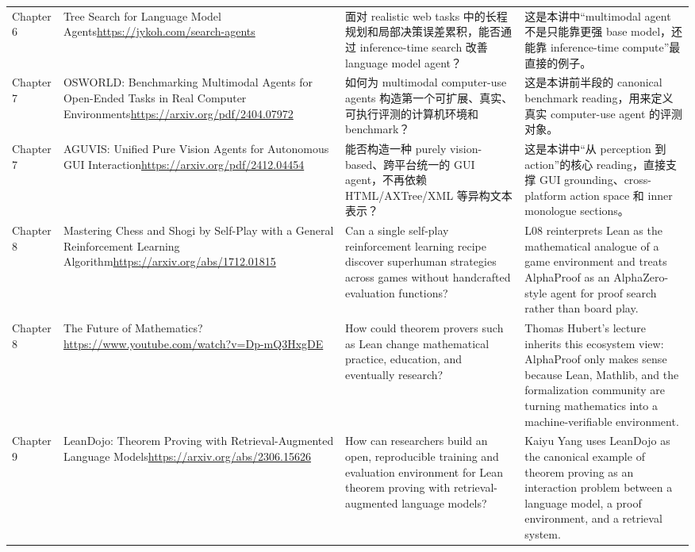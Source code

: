 \begin{longtable}{p{}p{}p{}p{}}
Chapter 6 & Tree Search for Language Model Agents\newline\url{https://jykoh.com/search-agents} & 面对 realistic web tasks 中的长程规划和局部决策误差累积，能否通过 inference-time search 改善 language model agent？ & 这是本讲中“multimodal agent 不是只能靠更强 base model，还能靠 inference-time compute”最直接的例子。 \\
Chapter 7 & OSWORLD: Benchmarking Multimodal Agents for Open-Ended Tasks in Real Computer Environments\newline\url{https://arxiv.org/pdf/2404.07972} & 如何为 multimodal computer-use agents 构造第一个可扩展、真实、可执行评测的计算机环境和 benchmark？ & 这是本讲前半段的 canonical benchmark reading，用来定义真实 computer-use agent 的评测对象。 \\
Chapter 7 & AGUVIS: Unified Pure Vision Agents for Autonomous GUI Interaction\newline\url{https://arxiv.org/pdf/2412.04454} & 能否构造一种 purely vision-based、跨平台统一的 GUI agent，不再依赖 HTML/AXTree/XML 等异构文本表示？ & 这是本讲中“从 perception 到 action”的核心 reading，直接支撑 GUI grounding、cross-platform action space 和 inner monologue sections。 \\
Chapter 8 & Mastering Chess and Shogi by Self-Play with a General Reinforcement Learning Algorithm\newline\url{https://arxiv.org/abs/1712.01815} & Can a single self-play reinforcement learning recipe discover superhuman strategies across games without handcrafted evaluation functions? & L08 reinterprets Lean as the mathematical analogue of a game environment and treats AlphaProof as an AlphaZero-style agent for proof search rather than board play. \\
Chapter 8 & The Future of Mathematics?\newline\url{https://www.youtube.com/watch?v=Dp-mQ3HxgDE} & How could theorem provers such as Lean change mathematical practice, education, and eventually research? & Thomas Hubert's lecture inherits this ecosystem view: AlphaProof only makes sense because Lean, Mathlib, and the formalization community are turning mathematics into a machine-verifiable environment. \\
Chapter 9 & LeanDojo: Theorem Proving with Retrieval-Augmented Language Models\newline\url{https://arxiv.org/abs/2306.15626} & How can researchers build an open, reproducible training and evaluation environment for Lean theorem proving with retrieval-augmented language models? & Kaiyu Yang uses LeanDojo as the canonical example of theorem proving as an interaction problem between a language model, a proof environment, and a retrieval system. \\

\end{longtable}
